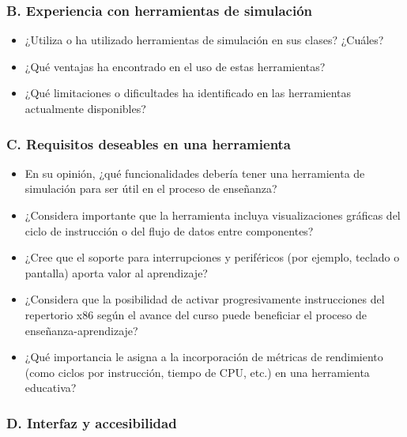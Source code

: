 \documentclass[12pt,oneside]{templates/unerthesis}
\providecommand{\tightlist}{%
  \setlength{\itemsep}{0pt}\setlength{\parskip}{0pt}}
\begin{document}
\hypertarget{b.-experiencia-con-herramientas-de-simulaciuxf3n}{%
\subsubsection{B. Experiencia con herramientas de simulación}\label{b.-experiencia-con-herramientas-de-simulaciuxf3n}}

\begin{itemize}
\tightlist
\item
  ¿Utiliza o ha utilizado herramientas de simulación en sus clases? ¿Cuáles?
\item
  ¿Qué ventajas ha encontrado en el uso de estas herramientas?
\item
  ¿Qué limitaciones o dificultades ha identificado en las herramientas actualmente disponibles?
\end{itemize}

\hypertarget{c.-requisitos-deseables-en-una-herramienta}{%
\subsubsection{C. Requisitos deseables en una herramienta}\label{c.-requisitos-deseables-en-una-herramienta}}

\begin{itemize}
\tightlist
\item
  En su opinión, ¿qué funcionalidades debería tener una herramienta de simulación para ser útil en el proceso de enseñanza?
\item
  ¿Considera importante que la herramienta incluya visualizaciones gráficas del ciclo de instrucción o del flujo de datos entre componentes?
\item
  ¿Cree que el soporte para interrupciones y periféricos (por ejemplo, teclado o pantalla) aporta valor al aprendizaje?
\item
  ¿Considera que la posibilidad de activar progresivamente instrucciones del repertorio x86 según el avance del curso puede beneficiar el proceso de enseñanza-aprendizaje?
\item
  ¿Qué importancia le asigna a la incorporación de métricas de rendimiento (como ciclos por instrucción, tiempo de CPU, etc.) en una herramienta educativa?
\end{itemize}

\hypertarget{d.-interfaz-y-accesibilidad}{%
\subsubsection{D. Interfaz y accesibilidad}\label{d.-interfaz-y-accesibilidad}}
\end{document}
